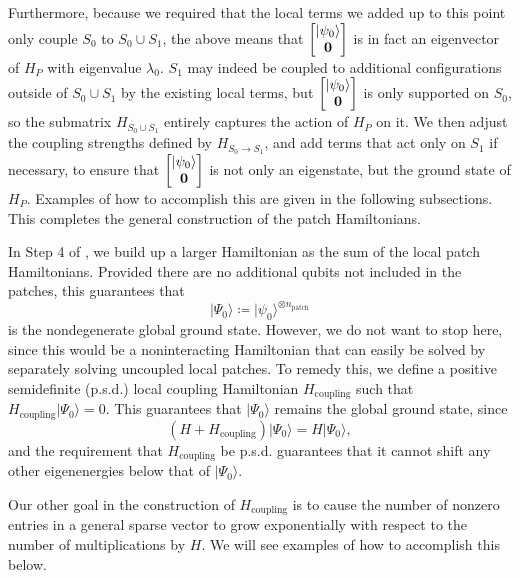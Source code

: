 \documentclass[
  reprint,            %
  amsmath,amssymb,
  aps,
  superscriptaddress, %
  longbibliography
]{revtex4-2}
\theoremstyle{definition}
\begin{document}
Furthermore, because we required that the local terms we added up to this point only couple $S_0$ to $S_0\cup S_1$, the above means that $\begin{bmatrix}|\psi_0\rangle\\\bf{0}\end{bmatrix}$ is in fact an eigenvector of $H_P$ with eigenvalue $\lambda_0$.
$S_1$ may indeed be coupled to additional configurations outside of $S_0\cup S_1$ by the existing local terms, but $\begin{bmatrix}|\psi_0\rangle\\\bf{0}\end{bmatrix}$ is only supported on $S_0$, so the submatrix $H_{S_0\cup S_1}$ entirely captures the action of $H_P$ on it.
We then adjust the coupling strengths defined by $H_{S_0\rightarrow S_1}$, and add terms that act only on $S_1$ if necessary, to ensure that $\begin{bmatrix}|\psi_0\rangle\\\bf{0}\end{bmatrix}$ is not only an eigenstate, but the ground state of $H_P$.
Examples of how to accomplish this are given in the following subsections.
This completes the general construction of the patch Hamiltonians.

In Step 4 of , we build up a larger Hamiltonian as the sum of the local patch Hamiltonians.
Provided there are no additional qubits not included in the patches, this guarantees that
\begin{equation}
\label{eq:global_gs}
    |\Psi_0\rangle \coloneqq |\psi_0\rangle^{\otimes n_\mathrm{patch}}
\end{equation}
is the nondegenerate global ground state.
However, we do not want to stop here, since this would be a noninteracting Hamiltonian that can easily be solved by separately solving uncoupled local patches.
To remedy this, we define a positive semidefinite (p.s.d.) local coupling Hamiltonian $H_\mathrm{coupling}$ such that $H_\mathrm{coupling}|\Psi_0\rangle=0$.
This guarantees that $|\Psi_0\rangle$ remains the global ground state, since
\begin{equation}
    (H+H_\mathrm{coupling})|\Psi_0\rangle = H|\Psi_0\rangle,
\end{equation}
and the requirement that $H_\mathrm{coupling}$ be p.s.d. guarantees that it cannot shift any other eigenenergies below that of $|\Psi_0\rangle$.  

Our other goal in the construction of $H_\mathrm{coupling}$ is to cause the number of nonzero entries in a general sparse vector to grow exponentially with respect to the number of multiplications by $H$.
We will see examples of how to accomplish this below.
\end{document}

